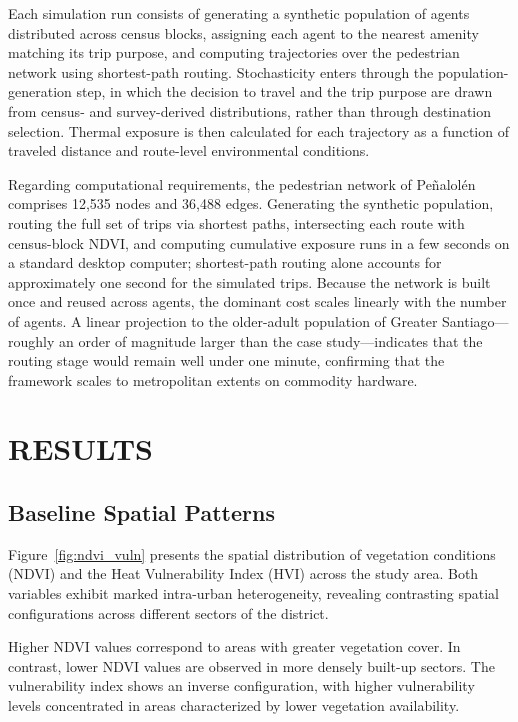 \documentclass{wscpaperproc}
\theoremstyle{wsc}
\begin{document}
Each simulation run consists of generating a synthetic population of agents distributed across census blocks, assigning each agent to the nearest amenity matching its trip purpose, and computing trajectories over the pedestrian network using shortest-path routing. Stochasticity enters through the population-generation step, in which the decision to travel and the trip purpose are drawn from census- and survey-derived distributions, rather than through destination selection.
Thermal exposure is then calculated for each trajectory as a function of traveled distance and route-level environmental conditions. %

Regarding computational requirements, the pedestrian network of Peñalolén comprises 12{,}535 nodes and 36{,}488 edges. Generating the synthetic population, routing the full set of trips via shortest paths, intersecting each route with census-block NDVI, and computing cumulative exposure runs in a few seconds on a standard desktop computer; shortest-path routing alone accounts for approximately one second for the simulated trips. Because the network is built once and reused across agents, the dominant cost scales linearly with the number of agents. A linear projection to the older-adult population of Greater Santiago—roughly an order of magnitude larger than the case study—indicates that the routing stage would remain well under one minute, confirming that the framework scales to metropolitan extents on commodity hardware.


\section{RESULTS}

\subsection{Baseline Spatial Patterns}

Figure~\ref{fig:ndvi_vuln} presents the spatial distribution of vegetation conditions (NDVI) and the Heat Vulnerability Index (HVI) across the study area. Both variables exhibit marked intra-urban heterogeneity, revealing contrasting spatial configurations across different sectors of the district.

Higher NDVI values correspond to areas with greater vegetation cover. In contrast, lower NDVI values are observed in more densely built-up sectors. The vulnerability index shows an inverse configuration, with higher vulnerability levels concentrated in areas characterized by lower vegetation availability.
\end{document}
